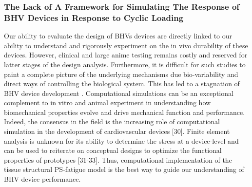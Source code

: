 \subsubsection{The Lack of A Framework for Simulating The Response of BHV Devices in Response to Cyclic Loading}

    Our ability to evaluate the design of BHVs devices are directly linked to our ability to understand and rigorously experiment on the in vivo durability of these devices. However, clinical and large anime testing remains costly and reserved for latter stages of the design analysis. Furthermore, it is difficult for such studies to paint a complete picture of the underlying mechanisms due bio-variability and direct ways of controlling the biological system. This has led to a stagnation of BHV device development \cite{schoen_cardiac_2005}. Computational simulations can be an exceptional complement to in vitro and animal experiment in understanding how biomechanical properties evolve and drive mechanical function and performance. Indeed, the consensus in the field is the increasing role of computational simulation in the development of cardiovascular devices [30]. Finite element analysis is unknown for its ability to determine the stress at a device-level and can be used to reiterate on conceptual designs to optimize the functional properties of prototypes [31-33]. Thus, computational implementation of the tissue structural PS-fatigue model is the best way to guide our understanding of BHV device performance.

